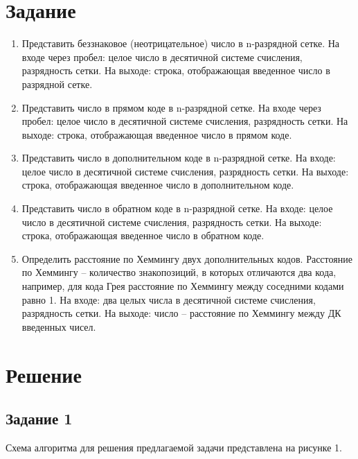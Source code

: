 \documentclass[a4paper,14pt]{extarticle}
\begin{document}
  \section*{Задание}
  \begin{enumerate}
    \item Представить беззнаковое (неотрицательное) число в n-разрядной сетке. На входе через пробел: целое число в десятичной системе счисления, разрядность сетки. На выходе: строка, отображающая введенное число в разрядной сетке.
    
    \item  Представить число в прямом коде в n-разрядной сетке. На входе через пробел: целое число в десятичной системе счисления, разрядность сетки. На выходе: строка, отображающая введенное число в прямом коде.
    
    \item Представить число в дополнительном коде в n-разрядной сетке. На входе: целое число в десятичной системе счисления, разрядность сетки. На выходе: строка, отображающая введенное число в дополнительном коде.
    
    \item Представить число в обратном коде в n-разрядной сетке. На входе: целое число в десятичной системе счисления, разрядность сетки. На выходе: строка, отображающая введенное число в обратном коде.
    
    \item Определить расстояние по Хеммингу двух дополнительных кодов. Расстояние по Хеммингу -- количество знакопозиций, в которых отличаются два кода, например, для кода Грея расстояние по Хеммингу между соседними кодами равно 1. На входе: два целых числа в десятичной системе счисления, разрядность сетки. На выходе: число -- расстояние по Хеммингу между ДК введенных чисел.
  \end{enumerate}

  \section*{Решение}
  \subsection*{Задание 1}
  Схема алгоритма для решения предлагаемой задачи представлена на рисунке 1.
\end{document}
